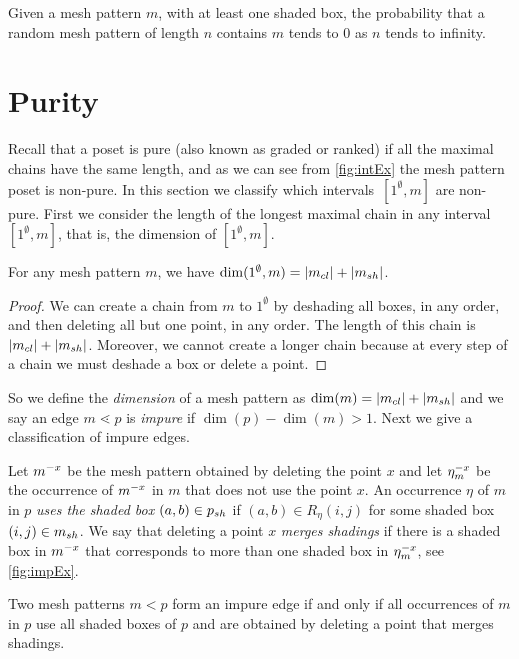 \documentclass[11pt,a4paper,oneside]{article}
\begin{document}
\begin{conj}
Given a mesh pattern $m$, with at least one shaded box, the probability that a random mesh pattern of length
$n$ contains $m$ tends to $0$ as $n$ tends to infinity.
\end{conj}




\section{Purity}\label{sec:purity}
Recall that a poset is pure (also known as graded or ranked) if all the maximal chains have the same length, and as we
can see from \cref{fig:intEx} the mesh pattern poset is non-pure. In this section we classify
which intervals~$[1^\emptyset,m]$ are non-pure. First we consider the length of the longest maximal chain in
any interval~$[1^\emptyset,m]$, that is, the dimension of $[1^\emptyset,m]$.

\begin{lem}
For any mesh pattern $m$, we have $\dim(1^\emptyset,m)=|\cl{m}|+|\sh{m}|$.
\begin{proof}
We can create a chain from $m$ to $1^\emptyset$ by deshading all boxes, in any order,
and then deleting all but one point, in any order. The length of this chain is $|\cl{m}|+|\sh{m}|$.
Moreover, we cannot create a longer chain because at every
step of a chain we must deshade a box or delete a point.
\end{proof}
\end{lem}

So we define the \emph{dimension} of a mesh pattern as $\dim(m)=|\cl{m}|+|\sh{m}|$ and we say an
edge $m\lessdot p$ is \emph{impure} if $\dim(p)-\dim(m)>1$.
Next we give a classification of impure edges.

 Let $\mX{m}{x}$ be the mesh pattern obtained by deleting the
point $x$ and let $\occX{m}{x}$ be the occurrence of $\mX{m}{x}$ in $m$ that does not
use the point $x$. An occurrence $\eta$ of $m$ in $p$ \emph{uses the shaded box $(a,b)\in\sh{p}$}
if $(a,b)\in R_\eta(i,j)$ for some shaded box $(i,j)\in\sh{m}$. We say that
deleting a point $x$ \emph{merges shadings} if
there is a shaded box in $\mX{m}{x}$ that corresponds to more than one shaded box in
$\occX{m}{x}$, see \cref{fig:impEx}.

\begin{lem}\label{lem:impureEdge}
Two mesh patterns $m<p$ form an impure edge if and only if all occurrences of $m$ in
$p$ use all shaded boxes of $p$ and are obtained by deleting a point that merges
shadings.
\end{lem}
\end{document}
